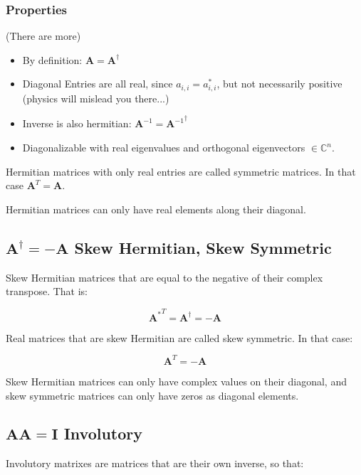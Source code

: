 \subsubsection{Properties}
(There are more)
\begin{itemize}
\item By definition: $\mathbf{A} = \mathbf{A}^\dagger$
\item Diagonal Entries are all real, since $a_{i,i} = a_{i,i}^*$, but not necessarily positive (physics will mislead you there...)
\item Inverse is also hermitian:  $\mathbf{A}^{-1} ={ \mathbf{A}^{-1}}^\dagger$
\item Diagonalizable with real eigenvalues and orthogonal eigenvectors $\in \mathbb{C}^n$.
\end{itemize}


Hermitian matrices with only real entries are called symmetric matrices. In that case $\mathbf{A}^T = \mathbf{A}$.

Hermitian matrices can only have real elements along their diagonal. 



\subsection{$\mathbf{A}^{\dagger} = -\mathbf{A}$ Skew Hermitian, Skew Symmetric}
Skew Hermitian matrices that are equal to the negative of their complex transpose. That is:

\begin{equation}
{\mathbf{A}^{*}}^T = \mathbf{A}^\dagger = -\mathbf{A} 
\end{equation}

Real matrices that are skew Hermitian are called skew symmetric. In that case:

\begin{equation}
\mathbf{A}^T = -\mathbf{A} 
\end{equation}


Skew Hermitian matrices can only have complex values on their diagonal, and skew symmetric matrices can only have zeros as diagonal elements.




\subsection{$\mathbf{A}\mathbf{A}=\mathbf{I}$ Involutory}
Involutory matrixes are matrices that are their own inverse, so that:


